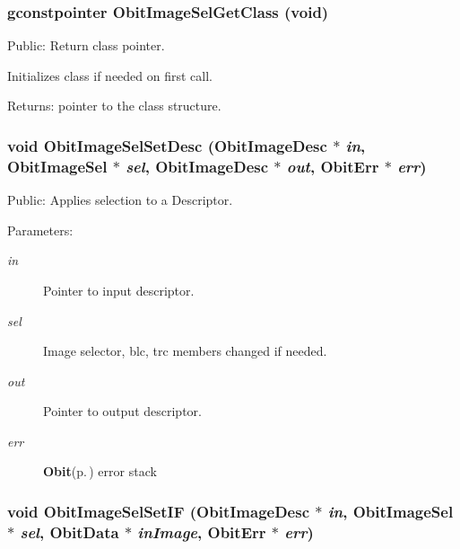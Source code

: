 \subsubsection{\setlength{\rightskip}{0pt plus 5cm}gconstpointer Obit\-Image\-Sel\-Get\-Class (void)}\label{ObitImageSel_8h_a6}


Public: Return class pointer. 

Initializes class if needed on first call. \begin{Desc}
\item[Returns:]pointer to the class structure. \end{Desc}
\subsubsection{\setlength{\rightskip}{0pt plus 5cm}void Obit\-Image\-Sel\-Set\-Desc ({\bf Obit\-Image\-Desc} $\ast$ {\em in}, {\bf Obit\-Image\-Sel} $\ast$ {\em sel}, {\bf Obit\-Image\-Desc} $\ast$ {\em out}, {\bf Obit\-Err} $\ast$ {\em err})}\label{ObitImageSel_8h_a10}


Public: Applies selection to a Descriptor. 

\begin{Desc}
\item[Parameters:]
\begin{description}
\item[{\em in}]Pointer to input descriptor. \item[{\em sel}]Image selector, blc, trc members changed if needed. \item[{\em out}]Pointer to output descriptor. \item[{\em err}]{\bf Obit}{\rm (p.\,\pageref{structObit})} error stack \end{description}
\end{Desc}
\subsubsection{\setlength{\rightskip}{0pt plus 5cm}void Obit\-Image\-Sel\-Set\-IF ({\bf Obit\-Image\-Desc} $\ast$ {\em in}, {\bf Obit\-Image\-Sel} $\ast$ {\em sel}, {\bf Obit\-Data} $\ast$ {\em in\-Image}, {\bf Obit\-Err} $\ast$ {\em err})}\label{ObitImageSel_8h_a11}


